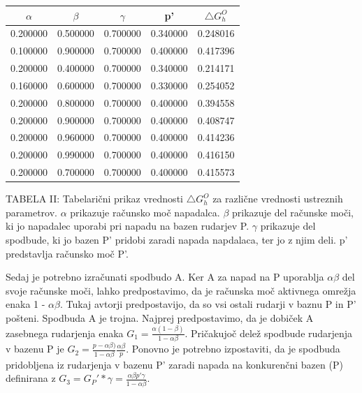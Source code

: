 \documentclass{acm_proc_article-sp}
\begin{document}
\begin{center}
  \begin{tabular}{ | c | c | c | c | c | }
    \hline
    $\alpha$ & $\beta$ & $\gamma$ & p' & $\bigtriangleup G_h^O $  \\ \hline
    0.200000 & 0.500000 & 0.700000 & 0.340000 & 0.248016 \\ \hline
    0.100000 & 0.900000 & 0.700000 & 0.400000 & 0.417396 \\ \hline
    0.200000 & 0.400000 & 0.700000 & 0.340000 & 0.214171 \\ \hline
    0.160000 & 0.600000 & 0.700000 & 0.330000 & 0.254052 \\ \hline
    0.200000 & 0.800000 & 0.700000 & 0.400000 & 0.394558 \\ \hline
    0.200000 & 0.900000 & 0.700000 & 0.400000 & 0.408747 \\ \hline
    0.200000 & 0.960000 & 0.700000 & 0.400000 & 0.414236 \\ \hline
    0.200000 & 0.990000 & 0.700000 & 0.400000 & 0.416150 \\ \hline
    0.200000 & 0.700000 & 0.700000 & 0.400000 & 0.415573 \\ \hline
  \end{tabular}
\end{center}
TABELA II: Tabelarični prikaz vrednosti $\bigtriangleup G_h^O $ za različne vrednosti ustreznih parametrov. $\alpha$ prikazuje računsko moč napadalca. $\beta$ prikazuje del računske moči, ki jo napadalec uporabi pri napadu na bazen rudarjev P. $\gamma$ prikazuje del spodbude, ki jo bazen P' pridobi zaradi napada napdalaca, ter jo z njim deli. p' predstavlja računsko moč P'.
\newline
\newline

Sedaj je potrebno izračunati spodbudo A. Ker A za napad na P uporablja $\alpha\beta$ del svoje računske moči, lahko predpostavimo, da je računska moč aktivnega omrežja enaka 1 - $\alpha\beta$. Tukaj avtorji predpostavijo\cite{originalarticle}, da so vsi ostali rudarji v baznu P in P' pošteni. Spodbuda A je trojna. Najprej predpostavimo, da je dobiček A zasebnega rudarjenja enaka $ G_1 = \frac{\alpha(1 - \beta)}{ 1 - \alpha\beta}$. Pričakujoč delež spodbude rudarjenja v bazenu P je $ G_2 = \frac{p - \alpha\beta)}{ 1 - \alpha\beta} \frac{\alpha\beta}{p}$. Ponovno je potrebno izpostaviti, da je spodbuda pridobljena iz rudarjenja v bazenu P' zaradi napada na konkurenčni bazen (P) definirana z $ G_3 = G_P' * \gamma = \frac{\alpha\beta p' \gamma}{1 - \alpha\beta} $. 
\end{document}
